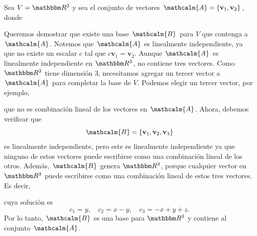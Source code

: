 \begin{examplebox}{}{}
    Sea $V = \RR[3]$ y sea el conjunto de vectores $\mathcalm{A} = \{ \mathbf{v}_1, \mathbf{v}_2 \}$, donde
    \begin{matrizn}
    \end{matrizn}
    Queremos demostrar que existe una base $\mathcalm{B}$ para $V$ que contenga a $\mathcalm{A}$. Notemos que $\mathcalm{A}$ es linealmente independiente, ya que no existe un escalar $c$ tal que $c\mathbf{v}_1 = \mathbf{v}_2$. Aunque $\mathcalm{A}$ es linealmente independiente en $\RR[3]$, no contiene tres vectores. Como $\RR[3]$ tiene dimensión 3, necesitamos agregar un tercer vector a $\mathcalm{A}$ para completar la base de $V$. Podemos elegir un tercer vector, por ejemplo,
    \begin{matrizn}
    \end{matrizn}
    que no es combinación lineal de los vectores en $\mathcalm{A}$. Ahora, debemos verificar que
    $$\mathcalm{B} = \{ \mathbf{v}_1, \mathbf{v}_2, \mathbf{v}_3 \}$$
    es linealmente independiente, pero este es linealmente independiente ya que ninguno de estos vectores puede escribirse como una combinación lineal de los otros. Además, $\mathcalm{B}$ genera $\RR[3]$, porque cualquier vector en $\RR[3]$ puede escribirse como una combinación lineal de estos tres vectores. Es decir,
    \begin{matrizn}
    \end{matrizn}
    cuya solución es
    $$c_1 = y, \quad c_2 = x - y, \quad c_3 = -x + y + z.$$
    Por lo tanto, $\mathcalm{B}$ es una base para $\RR[3]$ y contiene al conjunto $\mathcalm{A}$.
\end{examplebox}

